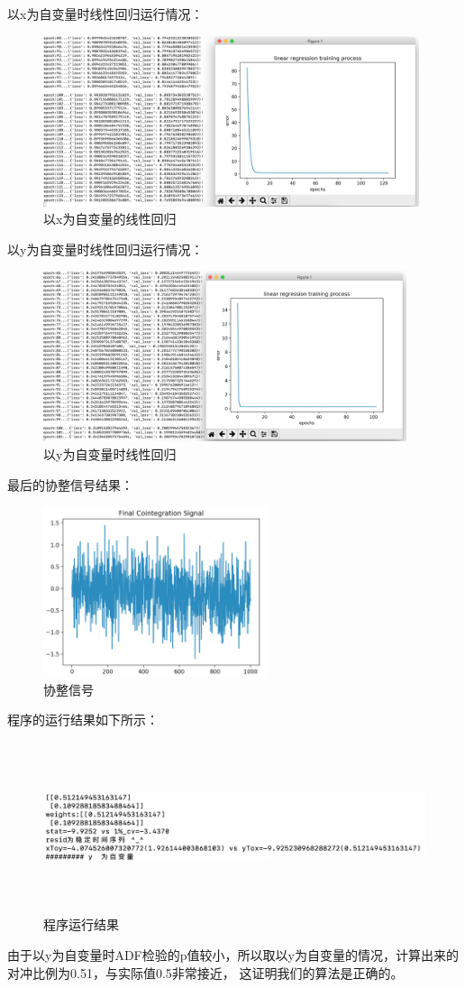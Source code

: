 \documentclass{article}
\begin{document}
以x为自变量时线性回归运行情况：
\begin{figure}[H]
	\caption{以x为自变量的线性回归}
	\label{f000050}
	\centering
	\includegraphics[height=5cm]{images/f000050}
\end{figure}
以y为自变量时线性回归运行情况：
\begin{figure}[H]
	\caption{以y为自变量时线性回归}
	\label{f000051}
	\centering
	\includegraphics[height=5cm]{images/f000051}
\end{figure}
最后的协整信号结果：
\begin{figure}[H]
	\caption{协整信号}
	\label{f000052}
	\centering
	\includegraphics[height=5cm]{images/f000052}
\end{figure}
程序的运行结果如下所示：
\begin{figure}[H]
	\caption{程序运行结果}
	\label{f000053}
	\centering
	\includegraphics[height=5cm]{images/f000053}
\end{figure}
由于以y为自变量时ADF检验的p值较小，所以取以y为自变量的情况，计算出来的对冲比例为0.51，与实际值0.5非常接近，
这证明我们的算法是正确的。
\end{document}
